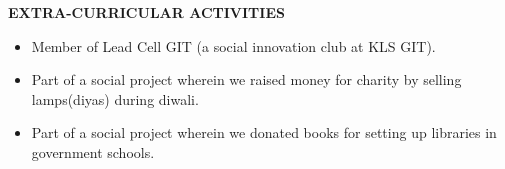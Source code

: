 \documentclass[a4paper]{article}
\begin{document}
	\begin{flushleft}
		\vspace{5mm}
		\large{\textbf{EXTRA-CURRICULAR ACTIVITIES }} 
		\vspace{0.5mm}
		\noindent\hrulefill
		\vspace{0.5mm}
	\end{flushleft}
	\begin{itemize}
		\item Member of Lead Cell GIT (a social innovation club at KLS GIT). 
		\item Part of a social project wherein we raised money for charity by selling lamps(diyas) during diwali. 
		\item Part of a social project wherein we donated books for setting up libraries in government schools.           
	\end{itemize}
\end{document}
